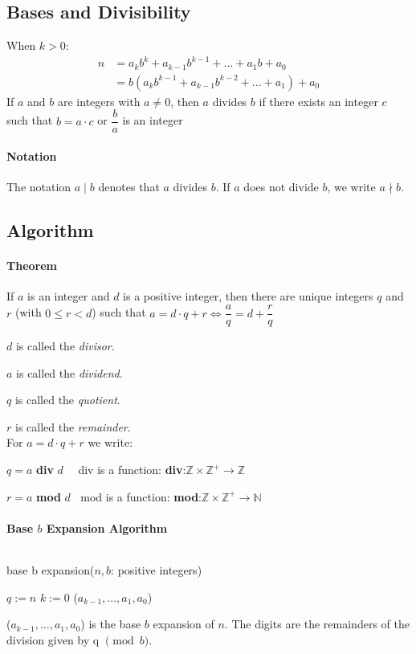 \documentclass[10pt,a4paper]{book}
\newcommand{\N}{\mathbb{N}}
\newcommand{\Z}{\mathbb{Z}}
\begin{document}
\subsection{Bases and Divisibility}
When $k > 0$: 
\begin{align*}
n &= a_kb^k + a_{k-1}b^{k-1} + ... + a_1b + a_0\\
  &= b(a_kb^{k-1} + a_{k-1}b^{k-2} + ... + a_1) + a_0
\end{align*}
If $a$ and $b$ are integers with $a \neq 0$, then $a$ divides $b$ if there exists an integer $c$ such that $b=a\cdot c$ or $\dfrac{b}{a}$ is an integer
\paragraph*{Notation}
The notation $a \mid b$ denotes that $a$ divides $b$. If $a$ does not divide $b$, we write $a \nmid b$.
\subsection{Algorithm}
\paragraph*{Theorem}
If $a$ is an integer and $d$ is a positive integer, then there are unique integers $q$ and $r$ (with $0 \leq r < d$) such that $a=d\cdot q + r \Leftrightarrow \dfrac{a}{q} = d+\dfrac{r}{q}$\par
$d$ is called the \textit{divisor}.\par
$a$ is called the \textit{dividend}.\par
$q$ is called the \textit{quotient}.\par
$r$ is called the \textit{remainder}.\\
For $a=d\cdot q + r$ we write:\par 
$q = a$ \textbf{div} $d\ \ \ \ \ \ $div is a function: \textbf{div}:$\Z\times\Z^+ \to \Z$\par 
$r = a$ \textbf{mod} $d\ \ \ \ $mod is a function: \textbf{mod}:$\Z\times\Z^+ \to \N$ \par 
\paragraph*{Base $b$ Expansion Algorithm}
$\ $\\
\begin{procedure}
\caption{base b expansion($n,b$: positive integers)}
\DontPrintSemicolon
\SetAlgoNoEnd
$q := n$\;
$k := 0$\;
\KwRet ($a_{k-1},...,a_1,a_0$)
\end{procedure}
{($a_{k-1},...,a_1,a_0$)} is the base $b$ expansion of $n$. The digits are the remainders of the division given by q $\pmod{b}$.
\end{document}
